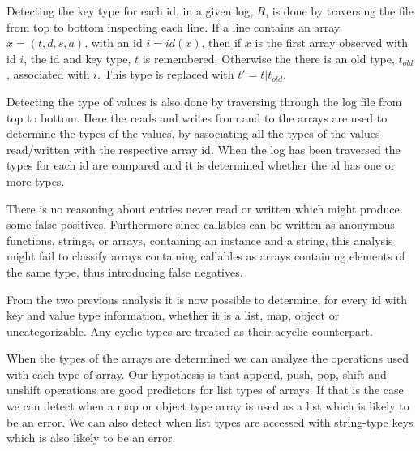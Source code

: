 Detecting the key type for each id, in a given log, $R$, is done by traversing the file from top to bottom inspecting each line. If a line contains an array $x = (t,d,s,a)$, with an id $i= id(x)$, then if $x$ is the first array observed with id $i$, the id and key type, $t$ is remembered. Otherwise the there is an old type, $t_{old}$, associated with $i$. This type is replaced with $t' = t | t_{old}$.

Detecting the type of values is also done by traversing through the log file from top to bottom. Here the reads and writes from and to the arrays are used to determine the types of the values, by associating all the types of the values read/written with the respective array id. When the log has been traversed the types for each id are compared and it is determined whether the id has one or more types. 

There is no reasoning about entries never read or written which might produce some false positives. Furthermore since callables can be written as anonymous functions, strings, or arrays, containing an instance and a string, this analysis might fail to classify arrays containing callables as arrays containing elements of the same type, thus introducing false negatives.   

From the two previous analysis it is now possible to determine, for every id with key and value type information, whether it is a list, map, object or uncategorizable. Any cyclic types are treated as their acyclic counterpart.

When the types of the arrays are determined we can analyse the operations used with each type of array. Our hypothesis is that append, push, pop, shift and unshift operations are good predictors for list types of arrays. If that is the case we can detect when a map or object type array is used as a list which is likely to be an error. We can also detect when list types are accessed with string-type keys which is also likely to be an error.

\begin{comment}
Combining the information from the two previous sections it is possible to  identify three groups of arrays: lists, maps and objects. What will be interesting to see is whether identified arrays stay in one of these groups for its entire lifetime or whether they change types throughout a test-run.

If arrays almost never changes types we can make our static analysis assume that arrays never change types without introducing too many errors by being unsound.
\end{comment}
